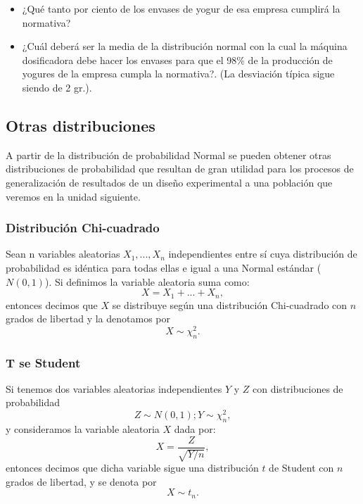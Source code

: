 \documentclass[
]{book}
\providecommand{\tightlist}{%
  \setlength{\itemsep}{0pt}\setlength{\parskip}{0pt}}
\begin{document}
\begin{itemize}
  \begin{itemize}
  \tightlist
  \item
    ¿Qué tanto por ciento de los envases de yogur de esa empresa cumplirá la normativa?
  \item
    ¿Cuál deberá ser la media de la distribución normal con la cual la máquina dosificadora debe hacer los envases para que el 98\% de la producción de yogures de la empresa cumpla la normativa?. (La desviación típica sigue siendo de 2 gr.).
  \end{itemize}
\end{itemize}

\hypertarget{otras-distribuciones}{%
\subsection{Otras distribuciones}\label{otras-distribuciones}}

A partir de la distribución de probabilidad Normal se pueden obtener otras distribuciones de probabilidad que resultan de gran utilidad para los procesos de generalización de resultados de un diseño experimental a una población que veremos en la unidad siguiente.

\hypertarget{distribuciuxf3n-chi-cuadrado}{%
\subsubsection{Distribución Chi-cuadrado}\label{distribuciuxf3n-chi-cuadrado}}

Sean n variables aleatorias \(X_1,...,X_n\) independientes entre sí cuya distribución de probabilidad es idéntica para todas ellas e igual a una Normal estándar (\(N(0,1)\)). Si definimos la variable aleatoria suma como:
\[X = X_1 + ... + X_n,\] entonces decimos que \(X\) se distribuye según una distribución Chi-cuadrado con \(n\) grados de libertad y la denotamos por \[X \sim \chi^2_n.\]

\hypertarget{t-se-student}{%
\subsubsection{T se Student}\label{t-se-student}}

Si tenemos dos variables aleatorias independientes \(Y\) y \(Z\) con distribuciones de probabilidad
\[Z \sim N(0,1); Y \sim \chi^2_n,\] y consideramos la variable aleatoria \(X\) dada por:
\[X = \frac{Z}{\sqrt{Y/n}},\] entonces decimos que dicha variable sigue una distribución \(t\) de Student con \(n\) grados de libertad, y se denota por
\[X \sim t_n.\]
\end{document}
